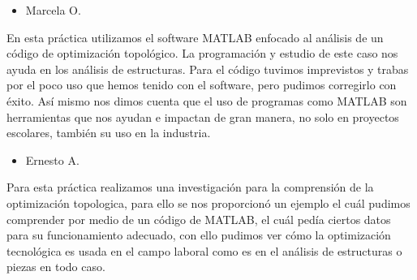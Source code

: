 \documentclass{article}
\begin{document}
\begin{itemize}
    \item Marcela O.
\end{itemize}
En esta práctica utilizamos el software MATLAB enfocado al análisis de un código de optimización topológico. La programación y estudio de este caso nos ayuda en los análisis de estructuras. Para el código tuvimos imprevistos y trabas por el poco uso que hemos tenido con el software, pero pudimos corregirlo con éxito. Así mismo nos dimos cuenta que el uso de programas como MATLAB son herramientas que nos ayudan e impactan de gran manera, no solo en proyectos escolares, también su uso en la industria.

\begin{itemize}
    \item Ernesto A.
\end{itemize}
Para esta práctica realizamos una investigación para la comprensión de la optimización topologica, para ello se nos proporcionó un ejemplo el cuál pudimos comprender por medio de un código de MATLAB, el cuál pedía ciertos datos para su funcionamiento adecuado, con ello pudimos ver cómo la optimización tecnológica es usada en el campo laboral como es en el análisis de estructuras o piezas en todo caso.


\end{document}
